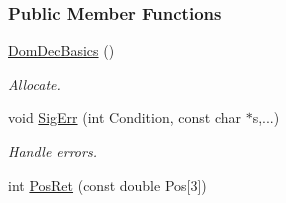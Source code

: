 \subsubsection*{\-Public \-Member \-Functions}
\begin{DoxyCompactItemize}
\item 
\hyperlink{classDomDecBasics_aec40201a10397aa0c646f6dcb31d03d9}{\-Dom\-Dec\-Basics} ()
\begin{DoxyCompactList}\small\item\em \-Allocate. \end{DoxyCompactList}\item 
void \hyperlink{classDomDecBasics_a013bde7a8eb6c66e70ab5d90959af2c2}{\-Sig\-Err} (int \-Condition, const char $\ast$s,...)
\begin{DoxyCompactList}\small\item\em \-Handle errors. \end{DoxyCompactList}\item 
\hypertarget{classDomDecBasics_ad10ce7d8491ba213cdbc79d4dd4dc013}{int \hyperlink{classDomDecBasics_ad10ce7d8491ba213cdbc79d4dd4dc013}{\-Pos\-Ret} (const double \-Pos\mbox{[}3\mbox{]})}\label{classDomDecBasics_ad10ce7d8491ba213cdbc79d4dd4dc013}


\end{DoxyCompactItemize}

